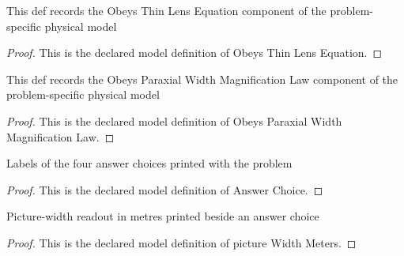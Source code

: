 \begin{definition}
  \label{def:physics:phyx-mini-0136:phyxminiproblems-problemphyxmini0136-obeysthinlensequation}
  This def records the Obeys Thin Lens Equation component of the problem-specific physical model
\end{definition}
\begin{proof}
  This is the declared model definition of Obeys Thin Lens Equation.
\end{proof}
\begin{definition}
  \label{def:physics:phyx-mini-0136:phyxminiproblems-problemphyxmini0136-obeysparaxialwidthmagnificationlaw}
  This def records the Obeys Paraxial Width Magnification Law component of the problem-specific physical model
\end{definition}
\begin{proof}
  This is the declared model definition of Obeys Paraxial Width Magnification Law.
\end{proof}
\begin{definition}
  \label{def:physics:phyx-mini-0136:phyxminiproblems-problemphyxmini0136-answerchoice}
  Labels of the four answer choices printed with the problem
\end{definition}
\begin{proof}
  This is the declared model definition of Answer Choice.
\end{proof}
\begin{definition}
  \label{def:physics:phyx-mini-0136:phyxminiproblems-problemphyxmini0136-answerchoice-picturewidthmeters}
  Picture-width readout in metres printed beside an answer choice
\end{definition}
\begin{proof}
  This is the declared model definition of picture Width Meters.
\end{proof}
